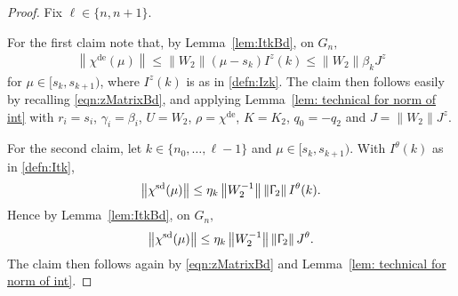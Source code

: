 \documentclass[usenames,dvipsnames,final,12pt]{colt2018} %
\newcommand{\Tw}{\Upgamma_2}
\newcommand{\Ww}{W_2}
\newcommand{\sw}{\beta}
\newcommand{\lz}{q_2}
\newcommand{\chizD}{\chi^{\dt}}
\newcommand{\chizS}{\chi^{\sd}}
\newcommand{\Ez}{E_2}
\newcommand{\LzD}{L_2^{\dt}}
\newcommand{\Kz}{K_2}
\newcommand{\EzD}{\Ez^{\dt}}
\newcommand{\dt}{\text{de}}
\newcommand{\sd}{\text{sd}}
\newcommand{\df}{\mathrm{d}}
\newcommand{\sI}[1]{s_{#1}}
\newcommand{\norm}[1]{\left\lVert#1\right\rVert}
\newcommand{\Jt}{J^\theta}
\newcommand{\Jz}{J^z}
\newcommand{\It}{I^\theta}
\newcommand{\Iz}{I^z}
\newcommand{\gugan}[1]{#1}
\begin{document}
\begin{proof}
Fix $\ell \in \{n, n + 1\}.$

For the first claim
note that, by Lemma~\ref{lem:ItkBd}, on $G_n,$
\begin{align*}
\norm{\chizD(\mu)} \leq \norm{\Ww} (\mu - \sI{k}) \Iz(k) \leq \norm{\Ww} \beta_k \Jz %
\end{align*}
for $\mu \in [\sI{k}, \sI{k + 1})$, where $\Iz(k)$ is as in \eqref{defn:Izk}.
The claim then follows easily by recalling \eqref{eqn:zMatrixBd}, and applying Lemma~\ref{lem: technical for norm of int}
 with $r_i = \sI{i}$, $\gamma_i=\beta_i$, $U = \Ww$, $\rho = \chizD$, $K = \Kz$, $q_0 = -\lz$ and $J=\norm{\Ww}\Jz$.

%
%
%
%
%
%
%
%

For the second claim, let $k \in \{n_0, \ldots,\ell - 1\}$ and $\mu \in [\sI{k}, \sI{k + 1}).$ With $\It(k)$  as in \eqref{defn:Itk},
%
\[
\norm{\chizS(\mu)} \leq \eta_k \norm{\Ww^{-1}} \norm{\Tw} \It(k).
\]
%
Hence by Lemma~\ref{lem:ItkBd}, on $G_n,$
%
\[
\norm{\chizS(\mu)} \leq \eta_k \norm{\Ww^{-1}} \norm{\Tw} \Jt.
\]
%
The claim then follows again by \eqref{eqn:zMatrixBd} and Lemma~\ref{lem: technical for norm of int}.



\end{proof}
\end{document}
